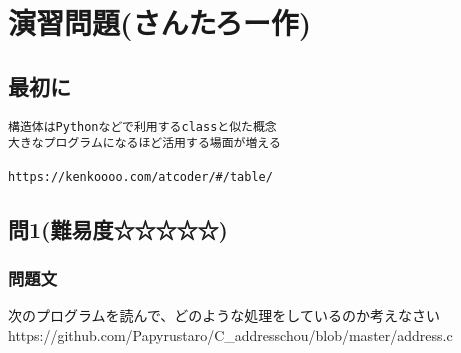\section{演習問題(さんたろー作)}
\subsection{最初に}
\begin{verbatim}
構造体はPythonなどで利用するclassと似た概念
大きなプログラムになるほど活用する場面が増える

https://kenkoooo.com/atcoder/#/table/

\end{verbatim}
\subsection{問1(難易度☆☆☆☆☆)}
\subsubsection{問題文}
次のプログラムを読んで、どのような処理をしているのか考えなさい\\

https://github.com/Papyrustaro/C_addresschou/blob/master/address.c
